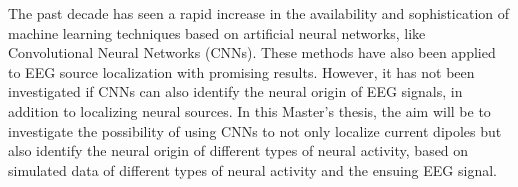 \documentclass[a4paper, UKenglish, 11pt]{uiomaster}
\begin{document}
The past decade has seen a rapid increase in the availability and sophistication of machine learning techniques based on artificial neural networks, like Convolutional Neural Networks (CNNs). These methods have also been applied to EEG source localization with promising results. However, it has not been investigated if CNNs can also identify the neural origin of EEG signals, in addition to localizing neural sources. In this Master’s thesis, the aim will be to investigate the possibility of using CNNs to not only localize current dipoles but also identify the neural origin of different types of neural activity, based on simulated data of different types of neural activity and the ensuing EEG signal.
\end{document}
